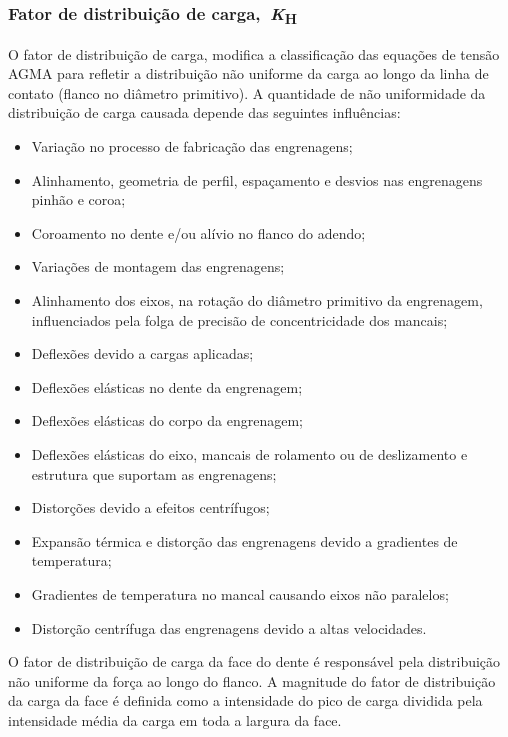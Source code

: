 \documentclass[12pt,a4paper]{article}
\providecommand{\tightlist}{\setlength{\itemsep}{0pt}\setlength{\parskip}{0pt}}%
\begin{document}
\subsubsection*{\texorpdfstring{Fator de distribuição de
carga,~\emph{K}\textsubscript{H}}{Fator de distribuição de carga,~KH}}

{\label{fator-de-distribuiuxe7uxe3o-de-carga-kh}}

O fator de distribuição de carga, modifica a classificação das equações
de tensão AGMA para refletir a distribuição não uniforme da carga ao
longo da linha de contato (flanco no diâmetro primitivo). A quantidade
de não uniformidade da distribuição de carga causada depende das
seguintes influências:

\begin{itemize}
\tightlist
\item
  Variação no processo de fabricação das engrenagens;
\item
  Alinhamento, geometria de perfil, espaçamento e desvios nas
  engrenagens pinhão e coroa;
\item
  Coroamento no dente e/ou alívio no flanco do adendo;
\item
  Variações de montagem das engrenagens;
\item
  Alinhamento dos eixos, na rotação do diâmetro primitivo da engrenagem,
  influenciados pela folga de precisão de concentricidade dos mancais;
\item
  Deflexões devido a cargas aplicadas;
\item
  Deflexões elásticas no dente da engrenagem;
\item
  Deflexões elásticas do corpo da engrenagem;
\item
  Deflexões elásticas do eixo, mancais de rolamento ou de deslizamento e
  estrutura que suportam as engrenagens;
\item
  Distorções devido a efeitos centrífugos;
\item
  Expansão térmica e distorção das engrenagens devido a gradientes de
  temperatura;
\item
  Gradientes de temperatura no mancal causando eixos não paralelos;
\item
  Distorção centrífuga das engrenagens devido a altas velocidades.
\end{itemize}

O fator de distribuição de carga da face do dente é responsável pela
distribuição não uniforme da força ao longo do flanco. A magnitude do
fator de distribuição da carga da face é definida como a intensidade do
pico de carga dividida pela intensidade média da carga em toda a largura
da face.
\end{document}
